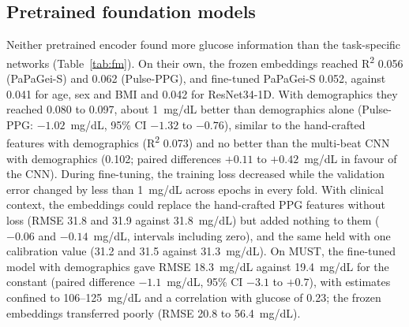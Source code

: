 \documentclass[11pt]{article}
\newcommand{\RR}{R\textsuperscript{2}}
\newcommand{\mgdl}{mg/dL}
\begin{document}
\subsection{Pretrained foundation models}
\label{sec:fm}
Neither pretrained encoder found more glucose information than the task-specific networks (Table~\ref{tab:fm}). On their own, the frozen embeddings reached \RR{} 0.056 (PaPaGei-S) and 0.062 (Pulse-PPG), and fine-tuned PaPaGei-S 0.052, against 0.041 for age, sex and BMI and 0.042 for ResNet34-1D. With demographics they reached 0.080 to 0.097, about 1~\mgdl{} better than demographics alone (Pulse-PPG: $-1.02$~\mgdl{}, 95\% CI $-1.32$ to $-0.76$), similar to the hand-crafted features with demographics (\RR{} 0.073) and no better than the multi-beat CNN with demographics (0.102; paired differences $+0.11$ to $+0.42$~\mgdl{} in favour of the CNN). During fine-tuning, the training loss decreased while the validation error changed by less than 1~\mgdl{} across epochs in every fold. With clinical context, the embeddings could replace the hand-crafted PPG features without loss (RMSE 31.8 and 31.9 against 31.8~\mgdl{}) but added nothing to them ($-0.06$ and $-0.14$~\mgdl{}, intervals including zero), and the same held with one calibration value (31.2 and 31.5 against 31.3~\mgdl{}). On MUST, the fine-tuned model with demographics gave RMSE 18.3~\mgdl{} against 19.4~\mgdl{} for the constant (paired difference $-1.1$~\mgdl{}, 95\% CI $-3.1$ to $+0.7$), with estimates confined to 106--125~\mgdl{} and a correlation with glucose of 0.23; the frozen embeddings transferred poorly (RMSE 20.8 to 56.4~\mgdl{}).
\end{document}

